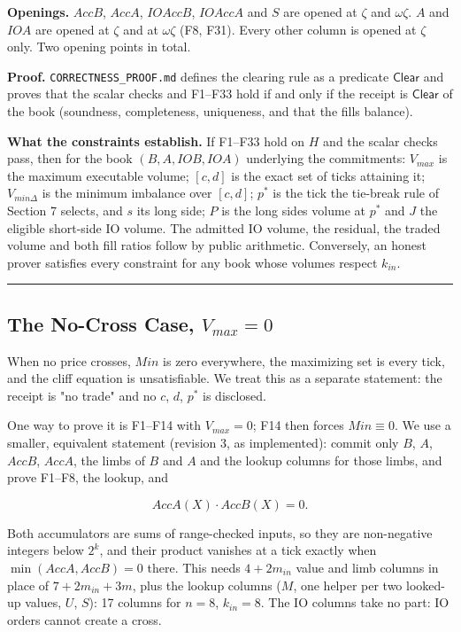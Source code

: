 \textbf{Openings.} \(AccB\), \(AccA\), \(IOAccB\), \(IOAccA\) and \(S\) are opened at \(\zeta\) and \(\omega\zeta\). \(A\) and \(IOA\) are opened at \(\zeta\) and at \(\omega\zeta\) (F8, F31). Every other column is opened at \(\zeta\) only. Two opening points in total.

\textbf{Proof.} \texttt{CORRECTNESS\_PROOF.md} defines the clearing rule as a predicate \(\mathsf{Clear}\) and proves that the scalar checks and F1--F33 hold if and only if the receipt is \(\mathsf{Clear}\) of the book (soundness, completeness, uniqueness, and that the fills balance).

\textbf{What the constraints establish.} If F1--F33 hold on \(H\) and the scalar checks pass, then for the book \((B, A, IOB, IOA)\) underlying the commitments: \(V_{max}\) is the maximum executable volume; \([c,d]\) is the exact set of ticks attaining it; \(V_{min\Delta}\) is the minimum imbalance over \([c,d]\); \(p^*\) is the tick the tie-break rule of Section 7 selects, and \(s\) its long side; \(P\) is the long side\textquotesingle s volume at \(p^*\) and \(J\) the eligible short-side IO volume. The admitted IO volume, the residual, the traded volume and both fill ratios follow by public arithmetic. Conversely, an honest prover satisfies every constraint for any book whose volumes respect \(k_{in}\).

\begin{center}\rule{0.5\linewidth}{0.5pt}\end{center}

\subsection{\texorpdfstring{The No-Cross Case, \(V_{max} = 0\)}{The No-Cross Case, V\_\{max\} = 0}}

When no price crosses, \(Min\) is zero everywhere, the maximizing set is every tick, and the cliff equation is unsatisfiable. We treat this as a separate statement: the receipt is "no trade" and no \(c\), \(d\), \(p^*\) is disclosed.

One way to prove it is F1--F14 with \(V_{max} = 0\); F14 then forces \(Min \equiv 0\). We use a smaller, equivalent statement (revision 3, as implemented): commit only \(B\), \(A\), \(AccB\), \(AccA\), the limbs of \(B\) and \(A\) and the lookup columns for those limbs, and prove F1--F8, the lookup, and

\[AccA(X) \cdot AccB(X) = 0.\]

Both accumulators are sums of range-checked inputs, so they are non-negative integers below \(2^k\), and their product vanishes at a tick exactly when \(\min(AccA, AccB) = 0\) there. This needs \(4 + 2m_{in}\) value and limb columns in place of \(7 + 2m_{in} + 3m\), plus the lookup columns (\(M\), one helper per two looked-up values, \(U\), \(S\)): 17 columns for \(n = 8\), \(k_{in} = 8\). The IO columns take no part: IO orders cannot create a cross.

